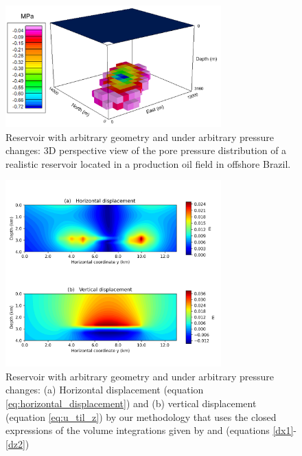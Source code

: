 \documentclass[journal abbreviation, manuscript]{copernicus}
\begin{document}


\begin{figure}[ht]
\includegraphics[width=8.3cm]{Fig/Figure_Pressure_complex_reservoir.png}
\caption{Reservoir with arbitrary geometry and under arbitrary pressure changes: 3D perspective view of the pore pressure distribution of a realistic reservoir 
located in a production oil field in offshore Brazil.}
\label{fig:pressure_complex_reservoir}
\end{figure}

\begin{figure}[ht]
\includegraphics[width=8.3cm]{Fig/Figure_Displacement_complex_reservoir.png}
\caption{Reservoir with arbitrary geometry and under arbitrary pressure changes: (a) Horizontal displacement (equation \ref{eq:horizontal_displacement}) and (b) vertical displacement (equation \ref{eq:u_til_z}) by our methodology that uses the closed expressions of the volume integrations given by \cite{Nagyetal2000} and \cite{Nagyetal2002} (equations \ref{dx1}-\ref{dz2})}
\label{fig:displacement_complex_reservoir}
\end{figure}
\end{document}
